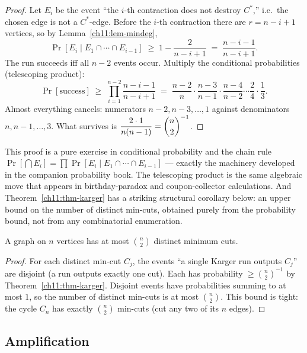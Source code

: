 \begin{proof}
Let $E_i$ be the event ``the $i$-th contraction does not destroy $C^\ast$,'' i.e.\ the chosen edge is not a $C^\ast$-edge. Before the $i$-th contraction there are $r=n-i+1$ vertices, so by Lemma~\ref{ch11:lem-mindeg},
\[
  \Pr[E_i \mid E_1\cap\cdots\cap E_{i-1}] \;\ge\; 1-\frac{2}{n-i+1}\;=\;\frac{n-i-1}{n-i+1}.
\]
The run succeeds iff all $n-2$ events occur. Multiply the conditional probabilities (telescoping product):
\[
  \Pr[\text{success}] \;\ge\; \prod_{i=1}^{n-2}\frac{n-i-1}{n-i+1}
  \;=\; \frac{n-2}{n}\cdot\frac{n-3}{n-1}\cdot\frac{n-4}{n-2}\cdots\frac{2}{4}\cdot\frac{1}{3}.
\]
Almost everything cancels: numerators $n-2,n-3,\dots,1$ against denominators $n,n-1,\dots,3$. What survives is $\dfrac{2\cdot 1}{n(n-1)}=\dbinom{n}{2}^{-1}$.
\end{proof}

\begin{connectionbox}
This proof is a pure exercise in conditional probability and the chain rule $\Pr[\bigcap E_i]=\prod \Pr[E_i\mid E_1\cap\cdots\cap E_{i-1}]$ --- exactly the machinery developed in the companion probability book. The telescoping product is the same algebraic move that appears in birthday-paradox and coupon-collector calculations. And Theorem~\ref{ch11:thm-karger} has a striking structural corollary below: an upper bound on the number of distinct min-cuts, obtained purely from the probability bound, not from any combinatorial enumeration.
\end{connectionbox}

\begin{corollary}\label{ch11:cor-count}
A graph on $n$ vertices has at most $\binom{n}{2}$ distinct minimum cuts.
\end{corollary}

\begin{proof}
For each distinct min-cut $C_j$, the events ``a single Karger run outputs $C_j$'' are disjoint (a run outputs exactly one cut). Each has probability $\ge\binom{n}{2}^{-1}$ by Theorem~\ref{ch11:thm-karger}. Disjoint events have probabilities summing to at most $1$, so the number of distinct min-cuts is at most $\binom{n}{2}$. This bound is tight: the cycle $C_n$ has exactly $\binom{n}{2}$ min-cuts (cut any two of its $n$ edges).
\end{proof}

\subsection{Amplification}

